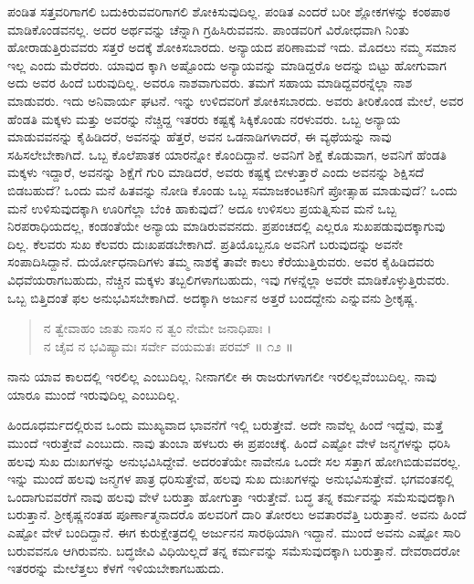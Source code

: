 ಪಂಡಿತ ಸತ್ತವರಿಗಾಗಲಿ ಬದುಕಿರುವವರಿಗಾಗಲಿ ಶೋಕಿಸುವುದಿಲ್ಲ. ಪಂಡಿತ ಎಂದರೆ ಬರೀ ಶ್ಲೋಕಗಳನ್ನು ಕಂಠಪಾಠ ಮಾಡಿಕೊಂಡವನಲ್ಲ. ಅದರ ಅರ್ಥವನ್ನು ಚೆನ್ನಾಗಿ ಗ್ರಹಿಸಿರುವವನು. ಪಾಂಡವರಿಗೆ ವಿರೋಧವಾಗಿ ನಿಂತು ಹೋರಾಡುತ್ತಿರುವವರು ಸತ್ತರೆ ಅದಕ್ಕೆ ಶೋಕಿಸಬಾರದು. ಅನ್ಯಾಯದ ಪರಿಣಾಮವೆ ಇದು. ಮೊದಲು ನಮ್ಮ ಸಮಾನ ಇಲ್ಲ ಎಂದು ಮೆರೆದರು. ಯಾವುದ ಕ್ಕಾಗಿ ಅಷ್ಟೊಂದು ಅನ್ಯಾಯವನ್ನು ಮಾಡಿದ್ದರೊ ಅದನ್ನು ಬಿಟ್ಟು ಹೋಗುವಾಗ ಅದು ಅವರ ಹಿಂದೆ ಬರುವುದಿಲ್ಲ. ಅವರೂ ನಾಶವಾಗುವರು. ತಮಗೆ ಸಹಾಯ ಮಾಡಿದ್ದವರನ್ನೆಲ್ಲಾ ನಾಶ ಮಾಡುವರು. ಇದು ಅನಿವಾರ್ಯ ಘಟನೆ. ಇನ್ನು ಉಳಿದವರಿಗೆ ಶೋಕಿಸಬಾರದು. ಅವರು ತೀರಿಕೊಂಡ ಮೇಲೆ, ಅವರ ಹೆಂಡತಿ ಮಕ್ಕಳು ಮತ್ತು ಅವರನ್ನು ನೆಚ್ಚಿದ್ದ ಇತರರು ಕಷ್ಟಕ್ಕೆ ಸಿಕ್ಕಿಕೊಂಡು ನರಳುವರು. ಒಬ್ಬ ಅನ್ಯಾಯ ಮಾಡುವವನನ್ನು ಕೈಹಿಡಿದರೆ, ಅವನನ್ನು ಹೆತ್ತರೆ, ಅವನ ಒಡನಾಡಿಗಳಾದರೆ, ಈ ವ್ಯಥೆಯನ್ನು ನಾವು ಸಹಿಸಲೇಬೇಕಾಗಿದೆ. ಒಬ್ಬ ಕೊಲೆಪಾತಕ ಯಾರನ್ನೋ ಕೊಂದಿದ್ದಾನೆ. ಅವನಿಗೆ ಶಿಕ್ಷೆ ಕೊಡುವಾಗ, ಅವನಿಗೆ ಹೆಂಡತಿ ಮಕ್ಕಳು ಇದ್ದಾರೆ, ಅವನನ್ನು ಶಿಕ್ಷೆಗೆ ಗುರಿ ಮಾಡಿದರೆ, ಅವರು ಕಷ್ಟಕ್ಕೆ ಬೀಳುತ್ತಾರೆ ಎಂದು ಅವನನ್ನು ಶಿಕ್ಷಿಸದೆ ಬಿಡಬಹುದೆ? ಒಂದು ಮನೆ ಹಿತವನ್ನು ನೋಡಿ ಕೊಂಡು ಒಬ್ಬ ಸಮಾಜಕಂಟಕನಿಗೆ ಪ್ರೋತ್ಸಾಹ ಮಾಡುವುದೆ? ಒಂದು ಮನೆ ಉಳಿಸುವುದಕ್ಕಾಗಿ ಊರಿಗೆಲ್ಲಾ ಬೆಂಕಿ ಹಾಕುವುದೆ? ಅದೂ ಉಳಿಸಲು ಪ್ರಯತ್ನಿಸುವ ಮನೆ ಒಬ್ಬ ನಿರಪರಾಧಿಯದಲ್ಲ, ಕಂಡಂತೆಯೇ ಅನ್ಯಾಯ ಮಾಡಿರುವವನದು. ಪ್ರಪಂಚದಲ್ಲಿ ಎಲ್ಲರೂ ಸುಖಪಡುವುದಕ್ಕಾಗುವು ದಿಲ್ಲ. ಕೆಲವರು ಸುಖ ಕೆಲವರು ದುಃಖಪಡಬೇಕಾಗಿದೆ. ಪ್ರತಿಯೊಬ್ಬನೂ ಅವನಿಗೆ ಬರುವುದನ್ನು ಅವನೇ ಸಂಪಾದಿಸಿದ್ದಾನೆ. ದುರ್ಯೋಧನಾದಿಗಳು ತಮ್ಮ ನಾಶಕ್ಕೆ ತಾವೇ ಕಾಲು ಕೆರೆಯುತ್ತಿರುವರು. ಅವರ ಕೈಹಿಡಿದವರು ವಿಧವೆಯರಾಗಬಹುದು, ನೆಚ್ಚಿನ ಮಕ್ಕಳು ತಬ್ಬಲಿಗಳಾಗಬಹುದು, ಇವು ಗಳನ್ನೆಲ್ಲಾ ಅವರೇ ಮಾಡಿಕೊಳ್ಳುತ್ತಿರುವರು. ಒಬ್ಬ ಬಿತ್ತಿದಂತೆ ಫಲ ಅನುಭವಿಸಬೇಕಾಗಿದೆ. ಅದಕ್ಕಾಗಿ ಅರ್ಜುನ ಅತ್ತರೆ ಬಂದದ್ದೇನು ಎನ್ನುವನು ಶ್ರೀಕೃಷ್ಣ.

\begin{verse}
ನ ತ್ವೇವಾಹಂ ಜಾತು ನಾಸಂ ನ ತ್ವಂ ನೇಮೇ ಜನಾಧಿಪಾಃ ।\\ನ ಚೈವ ನ ಭವಿಷ್ಯಾಮಃ ಸರ್ವೇ ವಯಮತಃ ಪರಮ್ \num{॥ ೧೨ ॥}
\end{verse}

{\small ನಾನು ಯಾವ ಕಾಲದಲ್ಲಿ ಇರಲಿಲ್ಲ ಎಂಬುದಿಲ್ಲ. ನೀನಾಗಲೀ ಈ ರಾಜರುಗಳಾಗಲೀ ಇರಲಿಲ್ಲವೆಂಬುದಿಲ್ಲ. ನಾವು ಯಾರೂ ಮುಂದೆ ಇರುವುದಿಲ್ಲ ಎಂಬುದಿಲ್ಲ.}

ಹಿಂದೂಧರ್ಮದಲ್ಲಿರುವ ಒಂದು ಮುಖ್ಯವಾದ ಭಾವನೆಗೆ ಇಲ್ಲಿ ಬರುತ್ತೇವೆ. ಅದೇ ನಾವೆಲ್ಲ ಹಿಂದೆ ಇದ್ದೆವು, ಮತ್ತೆ ಮುಂದೆ ಇರುತ್ತೇವೆ ಎಂಬುದು. ನಾವು ತುಂಬಾ ಹಳಬರು ಈ ಪ್ರಪಂಚಕ್ಕೆ. ಹಿಂದೆ ಎಷ್ಟೋ ವೇಳೆ ಜನ್ಮಗಳನ್ನು ಧರಿಸಿ ಹಲವು ಸುಖ ದುಃಖಗಳನ್ನು ಅನುಭವಿಸಿದ್ದೇವೆ. ಅದರಂತೆಯೇ ನಾವೇನೂ ಒಂದೇ ಸಲ ಸತ್ತಾಗ ಹೋಗಿಬಿಡುವವರಲ್ಲ. ಇನ್ನು ಮುಂದೆ ಹಲವು ಜನ್ಮಗಳ ಪಾತ್ರ ಧರಿಸುತ್ತೇವೆ, ಹಲವು ಸುಖ ದುಃಖಗಳನ್ನು ಅನುಭವಿಸುತ್ತೇವೆ. ಭಗವಂತನಲ್ಲಿ ಒಂದಾಗುವವರೆಗೆ ನಾವು ಹಲವು ವೇಳೆ ಬರುತ್ತಾ ಹೋಗುತ್ತಾ ಇರುತ್ತೇವೆ. ಬದ್ಧ ತನ್ನ ಕರ್ಮವನ್ನು ಸಮೆಸುವುದಕ್ಕಾಗಿ ಬರುತ್ತಾನೆ. ಶ್ರೀಕೃಷ್ಣನಂತಹ ಪೂರ್ಣಾತ್ಮನಾದರೊ ಹಲವರಿಗೆ ದಾರಿ ತೋರಲು ಅವತಾರವೆತ್ತಿ ಬರುತ್ತಾನೆ. ಅವನು ಹಿಂದೆ ಎಷ್ಟೋ ವೇಳೆ ಬಂದಿದ್ದಾನೆ. ಈಗ ಕುರುಕ್ಷೇತ್ರದಲ್ಲಿ ಅರ್ಜುನನ ಸಾರಥಿಯಾಗಿ ಇದ್ದಾನೆ. ಮುಂದೆ ಅವನು ಎಷ್ಟೋ ಸಾರಿ ಬರುವವನೂ ಆಗಿರುವನು. ಬದ್ಧಜೀವಿ ವಿಧಿಯಿಲ್ಲದೆ ತನ್ನ ಕರ್ಮವನ್ನು ಸಮೆಸುವುದಕ್ಕಾಗಿ ಬರುತ್ತಾನೆ. ದೇವರಾದರೋ ಇತರರನ್ನು ಮೇಲೆತ್ತಲು ಕೆಳಗೆ ಇಳಿಯಬೇಕಾಗಬಹುದು.

